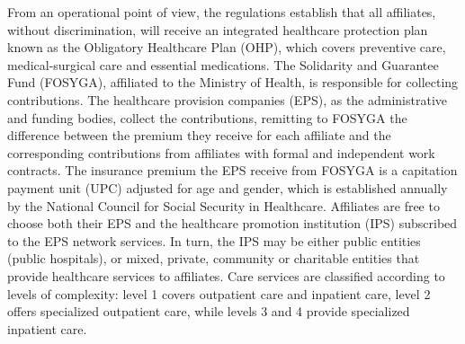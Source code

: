 \documentclass[11pt,a4paper,oneside]{article}
\begin{document}
From an operational point of view, the regulations establish that all affiliates, without discrimination, will receive an integrated healthcare protection plan known as the Obligatory Healthcare Plan (OHP), which covers preventive care, medical-surgical care and essential medications. The Solidarity and Guarantee Fund (FOSYGA), affiliated to the Ministry of Health, is responsible for collecting contributions. The healthcare provision companies (EPS), as the administrative and funding bodies, collect the contributions, remitting to FOSYGA the difference between the premium they receive for each affiliate and the corresponding contributions from affiliates with formal and independent work contracts. The insurance premium the EPS receive from FOSYGA is a capitation payment unit (UPC) adjusted for age and gender, which is established annually by the National Council for Social Security in Healthcare. Affiliates are free to choose both their EPS and the healthcare promotion institution (IPS) subscribed to the EPS network services. In turn, the IPS may be either public entities (public hospitals), or mixed, private, community or charitable entities that provide healthcare services to affiliates. Care services are classified according to levels of complexity: level 1 covers outpatient care and inpatient care, level 2 offers specialized outpatient care, while levels 3 and 4 provide specialized inpatient care.

\end{document}
